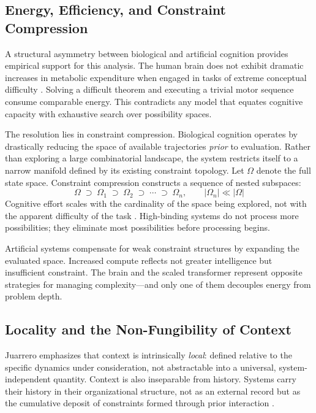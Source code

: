 \documentclass[11pt]{article}
\begin{document}
\subsection{Energy, Efficiency, and Constraint Compression}

A structural asymmetry between biological and artificial cognition provides empirical
support for this analysis. The human brain does not exhibit dramatic increases in metabolic
expenditure when engaged in tasks of extreme conceptual difficulty \citep{friston2010}.
Solving a difficult theorem and executing a trivial motor sequence consume comparable
energy. This contradicts any model that equates cognitive capacity with exhaustive search
over possibility spaces.

The resolution lies in constraint compression. Biological cognition operates by
drastically reducing the space of available trajectories \emph{prior} to evaluation.
Rather than exploring a large combinatorial landscape, the system restricts itself to a
narrow manifold defined by its existing constraint topology. Let $\Omega$ denote the
full state space. Constraint compression constructs a sequence of nested subspaces:
\[
\Omega \;\supset\; \Omega_1 \;\supset\; \Omega_2 \;\supset\; \cdots \;\supset\; \Omega_n, \qquad |\Omega_n| \ll |\Omega|
\]
Cognitive effort scales with the cardinality of the space being explored, not with the
apparent difficulty of the task \citep{kelso1995}. High-binding systems do not process
more possibilities; they eliminate most possibilities before processing begins.

Artificial systems compensate for weak constraint structures by expanding the evaluated
space. Increased compute reflects not greater intelligence but insufficient constraint.
The brain and the scaled transformer represent opposite strategies for managing
complexity---and only one of them decouples energy from problem depth.

\subsection{Locality and the Non-Fungibility of Context}

Juarrero emphasizes that context is intrinsically \emph{local}: defined relative to the
specific dynamics under consideration, not abstractable into a universal, system-independent
quantity. Context is also inseparable from history. Systems carry their history in their
organizational structure, not as an external record but as the cumulative deposit of
constraints formed through prior interaction \citep{thelen1994}.
\end{document}
